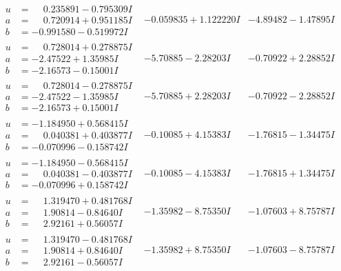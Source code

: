 \documentclass[1p]{elsarticle_modified}
\theoremstyle{definition}
\begin{document}
$$\begin{array}{c|c|c}
\begin{aligned}
u &= \phantom{-}0.235891 - 0.795309 I \\
a &= \phantom{-}0.720914 + 0.951185 I \\
b &= -0.991580 - 0.519972 I\end{aligned}
 & -0.059835 + 1.122220 I & -4.89482 - 1.47895 I \\ \hline\begin{aligned}
u &= \phantom{-}0.728014 + 0.278875 I \\
a &= -2.47522 + 1.35985 I \\
b &= -2.16573 - 0.15001 I\end{aligned}
 & -5.70885 - 2.28203 I & -0.70922 + 2.28852 I \\ \hline\begin{aligned}
u &= \phantom{-}0.728014 - 0.278875 I \\
a &= -2.47522 - 1.35985 I \\
b &= -2.16573 + 0.15001 I\end{aligned}
 & -5.70885 + 2.28203 I & -0.70922 - 2.28852 I \\ \hline\begin{aligned}
u &= -1.184950 + 0.568415 I \\
a &= \phantom{-}0.040381 + 0.403877 I \\
b &= -0.070996 - 0.158742 I\end{aligned}
 & -0.10085 + 4.15383 I & -1.76815 - 1.34475 I \\ \hline\begin{aligned}
u &= -1.184950 - 0.568415 I \\
a &= \phantom{-}0.040381 - 0.403877 I \\
b &= -0.070996 + 0.158742 I\end{aligned}
 & -0.10085 - 4.15383 I & -1.76815 + 1.34475 I \\ \hline\begin{aligned}
u &= \phantom{-}1.319470 + 0.481768 I \\
a &= \phantom{-}1.90814 - 0.84640 I \\
b &= \phantom{-}2.92161 + 0.56057 I\end{aligned}
 & -1.35982 - 8.75350 I & -1.07603 + 8.75787 I \\ \hline\begin{aligned}
u &= \phantom{-}1.319470 - 0.481768 I \\
a &= \phantom{-}1.90814 + 0.84640 I \\
b &= \phantom{-}2.92161 - 0.56057 I\end{aligned}
 & -1.35982 + 8.75350 I & -1.07603 - 8.75787 I \\ \hline\begin{aligned}

\end{aligned}
\end{array}$$
\end{document}
